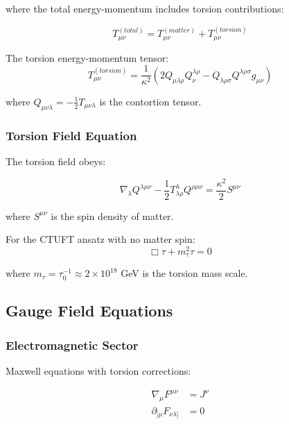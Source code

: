 where the total energy-momentum includes torsion contributions:

\begin{equation}
    T_{\mu\nu}^{(total)} = T_{\mu\nu}^{(matter)} + T_{\mu\nu}^{(torsion)}
\end{equation}

The torsion energy-momentum tensor:
\begin{equation}
    T_{\mu\nu}^{(torsion)} = \frac{1}{\kappa^2}\left(2Q_{\mu\lambda\rho}Q_{\nu}^{\lambda\rho} - Q_{\lambda\rho\sigma}Q^{\lambda\rho\sigma}g_{\mu\nu}\right)
\end{equation}

where $Q_{\mu\nu\lambda} = -\frac{1}{2}T_{\mu\nu\lambda}$ is the contortion tensor.

\subsubsection{Torsion Field Equation}

The torsion field obeys:

\begin{equation}
    \nabla_\lambda Q^{\lambda\mu\nu} - \frac{1}{2}T^\lambda_{\lambda\rho}Q^{\rho\mu\nu} = \frac{\kappa^2}{2}S^{\mu\nu}
\end{equation}

where $S^{\mu\nu}$ is the spin density of matter.

For the CTUFT ansatz with no matter spin:
\begin{equation}
    \Box \tau + m_\tau^2 \tau = 0
\end{equation}

where $m_\tau = \tau_0^{-1} \approx 2 \times 10^{18}$ GeV is the torsion mass scale.

\subsection{Gauge Field Equations}

\subsubsection{Electromagnetic Sector}

Maxwell equations with torsion corrections:

\begin{align}
    \nabla_\mu F^{\mu\nu} &= J^\nu \\
    \partial_{[\mu}F_{\nu\lambda]} &= 0
\end{align}

